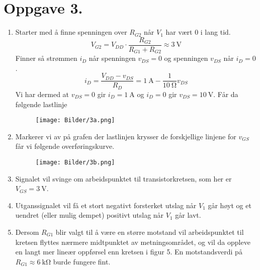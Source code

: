 \documentclass[a4paper,11pt,norsk]{article}
\begin{document}
\section*{Oppgave 3.}
\begin{enumerate}
    \item Starter med å finne spenningen over $R_{G2}$ når $V_1$ har vært 0 i lang tid.
        \[
            V_{G2} = V_{DD} \cdot \frac{R_{G2}}{R_{G1} + R_{G2}} \approx \SI{3}{\volt}
        \]
        Finner så strømmen $i_D$ når spenningen $v_{DS} = 0$ og spenningen $v_{DS}$ når $i_D = 0$.
        \[
            i_D = \frac{V_{DD} - v_{DS}}{R_D} = \SI{1}{\ampere} - \frac{1}{\SI{10}{\ohm}}v_{DS}
        \]
        Vi har dermed at $v_{DS} = 0$ gir $i_D = \SI{1}{\ampere}$ og $i_D = 0$ gir $v_{DS} = \SI{10}{\volt}$.
        Får da følgende lastlinje
        \begin{figure}[H]
            \centering 
            \texttt{[image: Bilder/3a.png]}
        \end{figure}
    \item Markerer vi av på grafen der lastlinjen krysser de forskjellige linjene for $v_{GS}$ får vi følgende overføringskurve.
        \begin{figure}[H]
            \centering
            \texttt{[image: Bilder/3b.png]}
        \end{figure}
    \item Signalet vil svinge om arbeidspunktet til transistorkretsen, som her er $V_{GS} = \SI{3}{\volt}$.
    \item Utganssignalet vil få et stort negativt forsterket utslag når $V_1$ går høyt og et uendret (eller mulig dempet) positivt utslag når 
        $V_1$ går lavt.
    \item Dersom $R_{G1}$ blir valgt til å være en større motstand vil arbeidspunktet til kretsen flyttes nærmere 
        midtpunktet av metningsområdet, og vil da oppleve en langt mer lineær oppførsel enn kretsen i figur 5. En motstandsverdi 
        på $R_{G1} \approx \SI{6}{\kilo\ohm}$ burde fungere fint.
\end{enumerate}
\end{document}
